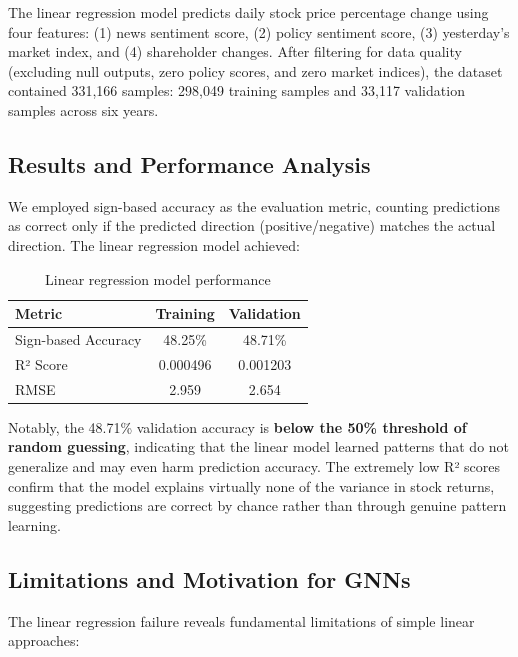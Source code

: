 The linear regression model predicts daily stock price percentage change using four features: (1) news sentiment score, (2) policy sentiment score, (3) yesterday's market index, and (4) shareholder changes. After filtering for data quality (excluding null outputs, zero policy scores, and zero market indices), the dataset contained 331,166 samples: 298,049 training samples and 33,117 validation samples across six years.

\subsection{Results and Performance Analysis}

We employed sign-based accuracy as the evaluation metric, counting predictions as correct only if the predicted direction (positive/negative) matches the actual direction. The linear regression model achieved:

\begin{table}[h]
\centering
\begin{tabular}{|l|c|c|}
\hline
\textbf{Metric} & \textbf{Training} & \textbf{Validation} \\
\hline
Sign-based Accuracy & 48.25\% & 48.71\% \\
\hline
R² Score & 0.000496 & 0.001203 \\
\hline
RMSE & 2.959 & 2.654 \\
\hline
\end{tabular}
\caption{Linear regression model performance}
\end{table}

Notably, the 48.71\% validation accuracy is \textbf{below the 50\% threshold of random guessing}, indicating that the linear model learned patterns that do not generalize and may even harm prediction accuracy. The extremely low R² scores confirm that the model explains virtually none of the variance in stock returns, suggesting predictions are correct by chance rather than through genuine pattern learning.

\subsection{Limitations and Motivation for GNNs}

The linear regression failure reveals fundamental limitations of simple linear approaches:

